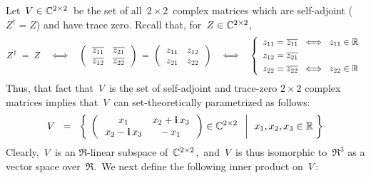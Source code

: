 \vskip 0.3cm
\noindent
Let \,$V \in \mathbb{C}^{2 \times 2}$\, be the set of all \,$2 \times 2$\, complex matrices
which are {\color{red}self-adjoint} ($Z^{\dagger} = Z$) and have {\color{red}trace zero}.
Recall that, for \,$Z \in \mathbb{C}^{2 \times 2}$,\,
\begin{equation*}
Z^{\dagger} \; = \; Z
\quad\Longleftrightarrow\quad
\left(\,\begin{array}{cc}
	\overline{z_{11}} & \overline{z_{21}}
	\\
	\overline{z_{12}} & \overline{z_{22}}
	\end{array}\,\right)
\; = \;
\left(\,\begin{array}{cc}
	z_{11} & z_{12}
	\\
	z_{21} & z_{22}
	\end{array}\,\right)
\quad\Longleftrightarrow\quad
\left\{\begin{array}{l}
	z_{11} = \overline{z_{11}} \;\;\Longleftrightarrow\;\; z_{11} \in \Re
	\\
	z_{12} \overset{{\color{white}1}}{=} \overline{z_{21}}
	\\
	z_{22} \overset{{\color{white}1}}{=} \overline{z_{22}} \;\;\Longleftrightarrow\;\; z_{22} \in \Re
	\end{array}\right.
\end{equation*}
Thus, that fact that \,$V$\, is the set of self-adjoint and trace-zero $2 \times 2$ complex matrices
implies that \,$V$\, can set-theoretically parametrized as follows:
\begin{equation*}
V
\;\; = \;\;
	\left\{\;\left.
		\left(\,\begin{array}{cc}
			x_{1} & x_{2} + \textnormal{\bf i}\,x_{3}
			\\
			x_{2} - \textnormal{\bf i}\,x_{3} & -\,x_{1}
			\end{array}\,\right)
		\in \mathbb{C}^{2 \times 2}
		\;\;\,\right\vert\;\,
		x_{1}, x_{2}, x_{3} \in \mathbb{R}
		\;\right\}
\end{equation*}
Clearly, \,$V$\, is an $\Re$-linear subspace of \,$\mathbb{C}^{2 \times 2}$,\,
and \,$V$\, is thus isomorphic to \,$\Re^{3}$ as a vector space over \,$\Re$.\,
We next define the following inner product on \,$V$\,:
